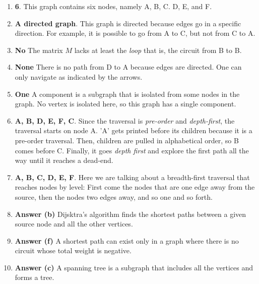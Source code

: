 \documentclass[11pt]{article}
\begin{document}
\begin{enumerate}
\item \textbf{6}. This graph contains six nodes, namely A, B, C. D, E, and F.

\item \textbf{A directed graph}. This graph is directed because edges go in a
specific direction. For example, it is possible to go from A to
C, but not from C to A.

\item \textbf{No} The matrix \(M\) lacks at least the \emph{loop} that is, the
circuit from B to B.

\item \textbf{None} There is no path from D to A because edges are directed.
One can only navigate as indicated by the arrows.

\item \textbf{One} A component is a subgraph that is isolated from some nodes in
the graph. No vertex is isolated here, so this graph has a single
component.

\item \textbf{A, B, D, E, F, C}. Since the traversal is \emph{pre-order} and
\emph{depth-first}, the traversal starts on node A. 'A' gets printed
before its children because it is a pre-order traversal. Then,
children are pulled in alphabetical order, so B comes before
C. Finally, it goes \emph{depth first} and explore the first path all
the way until it reaches a dead-end.

\item \textbf{A, B, C, D, E, F}. Here we are talking about a breadth-first
traversal that reaches nodes by level: First come the nodes that
are one edge away from the source, then the nodes two edges away,
and so one and so forth.

\item \textbf{Answer (b)} Dijsktra's algorithm finds the shortest paths between a
given source node and all the other vertices.

\item \textbf{Answer (f)} A shortest path can exist only in a graph where
there is no circuit whose total weight is negative.

\item \textbf{Answer (c)} A spanning tree is a subgraph that includes all the
vertices and forms a tree.
\end{enumerate}
\end{document}
